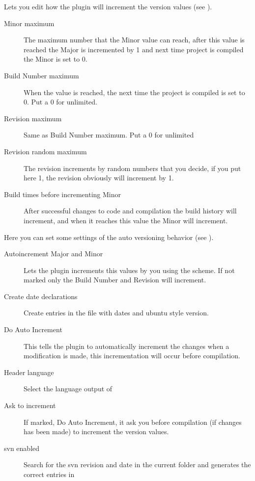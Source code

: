 

Lets you edit how the plugin will increment the version values (see ).


\begin{description}
\item[Minor maximum] The maximum number that the Minor value can reach, after this value is reached the Major is incremented by 1 and next time project is compiled the Minor is set to 0.
\item[Build Number maximum] When the value is reached, the next time the project is compiled is set to 0. Put a 0 for unlimited.
\item[Revision maximum] Same as Build Number maximum. Put a 0 for unlimited
\item[Revision random maximum] The revision increments by random numbers that you decide, if you put here 1, the revision obviously will increment by 1.
\item[Build times before incrementing Minor] After successful changes to code and compilation the build history will increment, and when it reaches this value the Minor will increment.
\end{description}


Here you can set some settings of the auto versioning behavior (see ).


\begin{description}
\item[Autoincrement Major and Minor] Lets the plugin increments this values by you using the scheme. If not marked only the Build Number and Revision will increment.
\item[Create date declarations] Create entries in the  file with dates and ubuntu style version.
\item[Do Auto Increment] This tells the plugin to automatically increment the changes when a modification is made, this incrementation will occur before compilation.
\item[Header language] Select the language output of 
\item[Ask to increment] If marked, Do Auto Increment, it ask you before compilation (if changes has been made) to increment the version values.
\item[svn enabled] Search for the svn revision and date in the current folder and generates the correct entries in 
\end{description}

